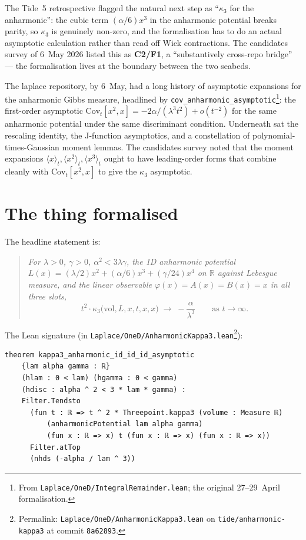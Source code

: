 \documentclass[11pt]{article}
\begin{document}
The Tide~5 retrospective flagged the natural next step as
``$\kappa_3$ for the anharmonic'': the cubic term $(\alpha/6)x^3$ in
the anharmonic potential breaks parity, so $\kappa_3$ is genuinely
non-zero, and the formalisation has to do an actual asymptotic
calculation rather than read off Wick contractions. The candidates
survey of 6~May 2026 listed this as \textbf{C2/F1}, a
``substantively cross-repo bridge'' --- the formalisation lives at the
boundary between the two seabeds.

The laplace repository, by 6~May, had a long history of asymptotic
expansions for the anharmonic Gibbs measure, headlined by
\texttt{cov\_anharmonic\_asymptotic}\footnote{From
\texttt{Laplace/OneD/IntegralRemainder.lean}; the original 27--29~April
formalisation.}: the first-order asymptotic
$\mathrm{Cov}_t[x^2, x] = -2\alpha/(\lambda^3 t^2) + o(t^{-2})$
for the same anharmonic potential under the same discriminant condition.
Underneath sat the rescaling identity, the J-function asymptotics, and a
constellation of polynomial-times-Gaussian moment lemmas. The candidates
survey noted that the moment expansions $\langle x \rangle_t,
\langle x^2 \rangle_t, \langle x^3 \rangle_t$ ought to have leading-order
forms that combine cleanly with $\mathrm{Cov}_t[x^2, x]$ to give the
$\kappa_3$ asymptotic.

\section{The thing formalised}

The headline statement is:

\begin{quote}\itshape
For $\lambda > 0$, $\gamma > 0$, $\alpha^2 < 3\lambda\gamma$, the
1D anharmonic potential $L(x) = (\lambda/2)x^2 + (\alpha/6)x^3 + (\gamma/24)x^4$
on $\mathbb{R}$ against Lebesgue measure, and the linear observable
$\varphi(x) = A(x) = B(x) = x$ in all three slots,
\[
  t^2 \cdot \kappa_3\!\big(\mathrm{vol}, L, x, t, x, x\big)
  \;\longrightarrow\; -\frac{\alpha}{\lambda^3}
  \qquad \text{as } t \to \infty.
\]
\end{quote}

The Lean signature (in
\texttt{Laplace/OneD/AnharmonicKappa3.lean}\footnote{Permalink:
\texttt{Laplace/OneD/AnharmonicKappa3.lean} on
\texttt{tide/anharmonic-kappa3} at commit \texttt{8a62893}.}):

\begin{verbatim}
theorem kappa3_anharmonic_id_id_id_asymptotic
    {lam alpha gamma : ℝ}
    (hlam : 0 < lam) (hgamma : 0 < gamma)
    (hdisc : alpha ^ 2 < 3 * lam * gamma) :
    Filter.Tendsto
      (fun t : ℝ => t ^ 2 * Threepoint.kappa3 (volume : Measure ℝ)
          (anharmonicPotential lam alpha gamma)
          (fun x : ℝ => x) t (fun x : ℝ => x) (fun x : ℝ => x))
      Filter.atTop
      (nhds (-alpha / lam ^ 3))
\end{verbatim}
\end{document}
